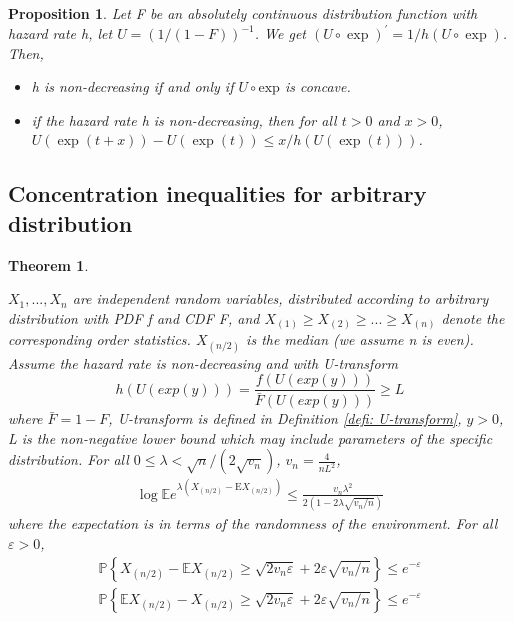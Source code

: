 \documentclass{article}
\theoremstyle{plain}
\newtheorem{theo}{Theorem}
\newtheorem{prop}{Proposition}
\begin{document}
\begin{prop}
\label{prop non-increasing hazard rate}
Let F be an absolutely continuous distribution function with hazard
rate h, let $U=(1 /(1-F))^{-1}$. We get $(U \circ \exp )^{\prime}=1 / h(U \circ \exp )$. Then,
\begin{itemize}
    \item h is non-decreasing if and only if $U \circ \mathrm{exp}$ is concave.
    \item if the hazard rate h is non-decreasing, then for all $t > 0$ and $x > 0$, $U(\exp (t+x))-U(\exp (t)) \leq x / h(U(\exp (t)))$.
\end{itemize}
\end{prop}
\subsection{Concentration inequalities for arbitrary distribution}

\begin{theo}
\label{theo: Concentration inequalities for arbitrary distribution}

$X_1, ..., X_n$ are independent random variables, distributed according to arbitrary distribution with PDF f and CDF F, and $X_{(1)} \geq X_{(2)} \geq ... \geq X_{(n)}$ denote the corresponding order statistics. $X_{(n/2)}$ is the median (we assume n is even). Assume the hazard rate is non-decreasing and with U-transform
$$h\left(U(exp(y))\right) = \frac{f\left(U(exp(y))\right)}{\bar{F}\left(U(exp(y))\right) } \geq L$$
where $\bar{F} = 1 - F$, U-transform is defined in Definition \ref{defi: U-transform}, $y > 0$, L is the non-negative lower bound which may include parameters of the specific distribution. For all $0 \leq \lambda< \sqrt{n} /\left(2 \sqrt{v_{n}}\right)$, $v_n = \frac{4}{n L^2}$,
\begin{align}
    \label{log inequality for arb}
    \log \mathbb{E}e^{\lambda\left(X_{(n / 2)}-\mathrm{E} X_{(n / 2)}\right)} \leq \frac{v_{n} \lambda^{2}}{2\left(1-2 \lambda \sqrt{v_{n} / n}\right)}
\end{align}
where the expectation is in terms of the randomness of the environment. For all $\varepsilon > 0$,
\begin{align}
    \label{inequality Bernstein upper bound for abr}
    \mathbb{P}\left\{X_{(n / 2)}-\mathbb{E} X_{(n / 2)} \geq \sqrt{2 v_{n} \varepsilon}+2 \varepsilon \sqrt{v_{n} / n}\right\} \leq e^{-\varepsilon}\\
    \label{inequality Bernstein lower bound for abr}
    \mathbb{P}\left\{\mathbb{E} X_{(n / 2)} - X_{(n / 2)} \geq \sqrt{2 v_{n} \varepsilon}+2 \varepsilon \sqrt{v_{n} / n}\right\} \leq e^{-\varepsilon}
\end{align}
\end{theo}
\end{document}
